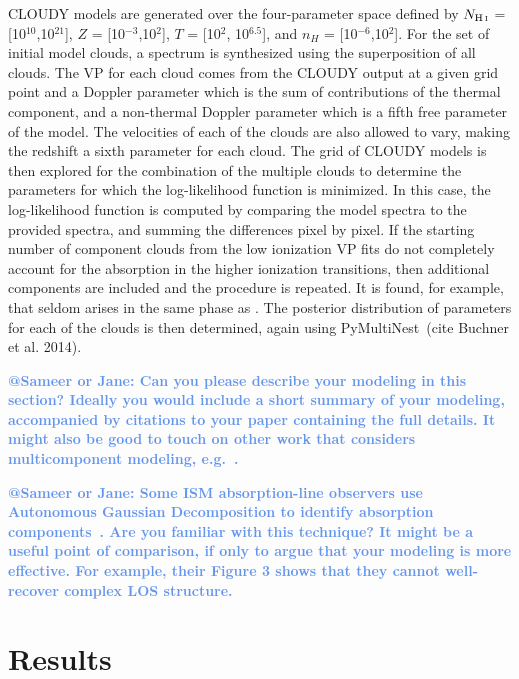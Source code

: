 \documentclass[fleqn,usenatbib]{mnras}
\makeatletter
\newcommand{\atsameer}[1]{\textcolor{CornflowerBlue}{\textbf{@Sameer or Jane: #1}}}
\makeatother
\begin{document}
CLOUDY models are generated over the four-parameter space defined by $N_{\ion{H}{I}}$ = [10$^{10}$,10$^{21}$], $Z$ = [10$^{-3}$,10$^{2}$], $T$ = [10$^{2}$, 10$^{6.5}$], and $n_H$ = [10$^{-6}$,10$^{2}$].  For the set of initial model clouds, a spectrum is synthesized using the superposition of all clouds.  The VP for each cloud comes from the CLOUDY output at a given grid point and a Doppler parameter which is the sum of contributions of the thermal component, and a non-thermal Doppler parameter which is a fifth free parameter of the model. The velocities of each of the clouds are also allowed to vary, making the redshift a sixth parameter for each cloud.
The grid of CLOUDY models is then explored for the combination of the multiple clouds to determine the parameters for which the log-likelihood function is minimized. In this case, the log-likelihood function is computed by comparing the model spectra to the provided spectra, and summing the differences pixel by pixel.
If the starting number of component clouds from the low ionization VP fits do not completely account for the absorption in the higher ionization transitions, then additional components are included and the procedure is repeated. It is found, for example, that  seldom arises in the same phase as . The posterior distribution of parameters for each of the clouds is then determined, again using PyMultiNest~(cite Buchner et al. 2014).


\atsameer{
Can you please describe your modeling in this section?
Ideally you would include a short summary of your modeling, accompanied by citations to your paper containing the full details.
It might also be good to touch on other work that considers multicomponent modeling, e.g.~\cite{Liang2018}.
}

\atsameer{
Some ISM absorption-line observers use Autonomous Gaussian Decomposition to identify absorption components~\citep[e.g.][]{Murray2017}.
Are you familiar with this technique?
It might be a useful point of comparison, if only to argue that your modeling is more effective.
For example, their Figure 3 shows that they cannot well-recover complex LOS structure.
}

\section{Results}
\label{s: results}
\end{document}
